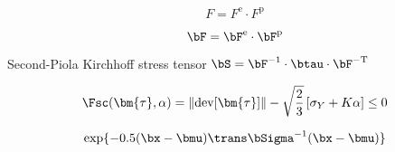 \begin{equation}
F = F^\mathrm{e} \cdot F^\mathrm{p}
\end{equation}

\begin{equation}
  \bF = \bF^\mathrm{e} \cdot \bF^\mathrm{p}
\end{equation}

Second-Piola Kirchhoff stress tensor $\bS = \bF^{-1} \cdot \btau \cdot \bF^{\mathrm{-T}}$

\begin{equation}
\Fsc(\bm{\tau},\alpha) = \|\mathrm{dev}[\bm{\tau}]\| - \sqrt{\frac{2}{3}}\left[\sigma_Y + K\alpha\right] \le 0
\end{equation}

\begin{equation}
  \exp\{-0.5 (\bx - \bmu)\trans \bSigma^{-1} (\bx - \bmu)\}
\end{equation}
